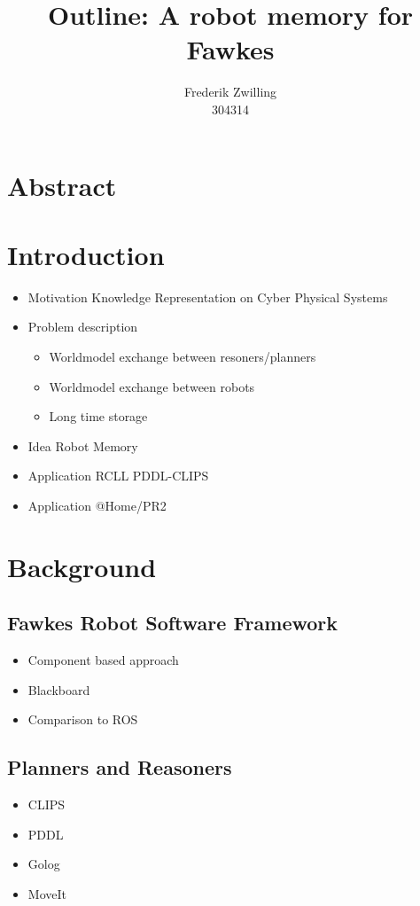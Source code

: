 \documentclass[a4paper,11pt]{article}
\author{Frederik Zwilling\\304314}
\title{Outline: A robot memory for Fawkes}
\begin{document}
\maketitle
\tableofcontents
\newpage



\section{Abstract}

\section{Introduction}
\begin{itemize}
\item Motivation Knowledge Representation on Cyber Physical Systems
\item Problem description
  \begin{itemize}
  \item Worldmodel exchange between resoners/planners
  \item Worldmodel exchange between robots
  \item Long time storage
  \end{itemize}
\item Idea Robot Memory
\item Application RCLL PDDL-CLIPS
\item Application @Home/PR2
\end{itemize}

\section{Background}
\subsection{Fawkes Robot Software Framework}
\begin{itemize}
\item Component based approach
\item Blackboard
\item Comparison to ROS
\end{itemize}
\subsection{Planners and Reasoners}
\begin{itemize}
\item CLIPS
\item PDDL
\item Golog
\item MoveIt
\end{itemize}
\end{document}
